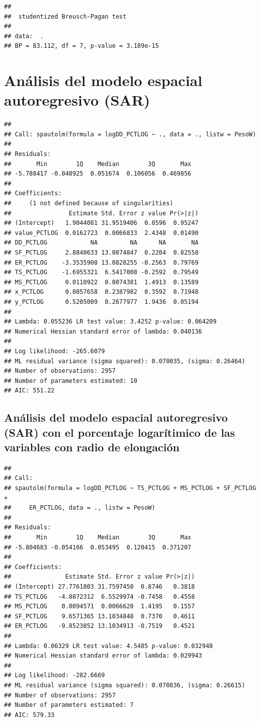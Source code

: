 \documentclass[11pt,]{article}
\begin{document}
\begin{verbatim}
## 
##  studentized Breusch-Pagan test
## 
## data:  .
## BP = 83.112, df = 7, p-value = 3.189e-15
\end{verbatim}

\section{Análisis del modelo espacial autoregresivo
(SAR)}\label{anuxe1lisis-del-modelo-espacial-autoregresivo-sar}

\begin{verbatim}
## 
## Call: spautolm(formula = logDD_PCTLOG ~ ., data = ., listw = PesoW)
## 
## Residuals:
##       Min        1Q    Median        3Q       Max 
## -5.788417 -0.048925  0.051674  0.106056  0.469856 
## 
## Coefficients: 
##     (1 not defined because of singularities)
##                Estimate Std. Error z value Pr(>|z|)
## (Intercept)   1.9044081 31.9519406  0.0596  0.95247
## value_PCTLOG  0.0162723  0.0066833  2.4348  0.01490
## DD_PCTLOG            NA         NA      NA       NA
## SF_PCTLOG     2.8840633 13.0874847  0.2204  0.82558
## ER_PCTLOG    -3.3535908 13.0828255 -0.2563  0.79769
## TS_PCTLOG    -1.6955321  6.5417008 -0.2592  0.79549
## MS_PCTLOG     0.0110922  0.0074381  1.4913  0.13589
## x_PCTLOG      0.0857658  0.2387982  0.3592  0.71948
## y_PCTLOG      0.5205009  0.2677977  1.9436  0.05194
## 
## Lambda: 0.055236 LR test value: 3.4252 p-value: 0.064209 
## Numerical Hessian standard error of lambda: 0.040136 
## 
## Log likelihood: -265.6079 
## ML residual variance (sigma squared): 0.070035, (sigma: 0.26464)
## Number of observations: 2957 
## Number of parameters estimated: 10 
## AIC: 551.22
\end{verbatim}

\subsection{Análisis del modelo espacial autoregresivo (SAR) con el
porcentaje logarítimico de las variables con radio de
elongación}\label{anuxe1lisis-del-modelo-espacial-autoregresivo-sar-con-el-porcentaje-logaruxedtimico-de-las-variables-con-radio-de-elongaciuxf3n}

\begin{verbatim}
## 
## Call: 
## spautolm(formula = logDD_PCTLOG ~ TS_PCTLOG + MS_PCTLOG + SF_PCTLOG + 
##     ER_PCTLOG, data = ., listw = PesoW)
## 
## Residuals:
##       Min        1Q    Median        3Q       Max 
## -5.804683 -0.054166  0.053495  0.120415  0.371207 
## 
## Coefficients: 
##               Estimate Std. Error z value Pr(>|z|)
## (Intercept) 27.7761803 31.7597450  0.8746   0.3818
## TS_PCTLOG   -4.8872312  6.5529974 -0.7458   0.4558
## MS_PCTLOG    0.0094571  0.0066620  1.4195   0.1557
## SF_PCTLOG    9.6571365 13.1034848  0.7370   0.4611
## ER_PCTLOG   -9.8523852 13.1034913 -0.7519   0.4521
## 
## Lambda: 0.06329 LR test value: 4.5485 p-value: 0.032948 
## Numerical Hessian standard error of lambda: 0.029943 
## 
## Log likelihood: -282.6669 
## ML residual variance (sigma squared): 0.070836, (sigma: 0.26615)
## Number of observations: 2957 
## Number of parameters estimated: 7 
## AIC: 579.33
\end{verbatim}
\end{document}

